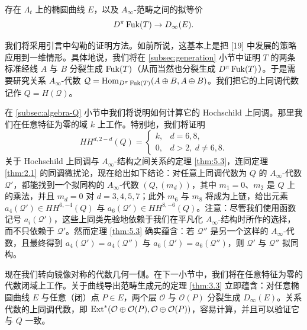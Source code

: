 \begin{theorem}\label{thm:6.1}
存在 $\Lambda_t$ 上的椭圆曲线 $E$，以及 $A_\infty$-范畴之间的拟等价
\[
D^\pi\operatorname{Fuk}(T)\to D_\infty(E).
\]
\end{theorem}


我们将采用引言中勾勒的证明方法。如前所说，这基本上是把 [19] 中发展的策略应用到一维情形。具体地说，我们将在 \ref{subsec:generation} 小节中证明 $T$ 的两条标准经线 $A$ 与 $B$ 分裂生成 $\operatorname{Fuk}(T)$（从而当然也分裂生成 $D^\pi\operatorname{Fuk}(T)$）。于是需要研究关系 $A_\infty$-代数 $\mathcal{Q}=\operatorname{Hom}_{D^\pi\operatorname{Fuk}(T)}(A\oplus B,A\oplus B)$。我们把它的上同调代数记作 $Q=H(\mathcal{Q})$。

在 \ref{subsec:algebra-Q} 小节中我们将说明如何计算它的 Hochschild 上同调。那里我们在任意特征为零的域 $k$ 上工作。特别地，我们将证明
\[
HH^{d,2-d}(Q)=\begin{cases}k, & d=6,8,\\ 0, & d>2,\ d\neq6,8.\end{cases}
\]
关于 Hochschild 上同调与 $A_\infty$-结构之间关系的定理 \ref{thm:5.3}，连同定理 \ref{thm:2.1} 的同调微扰论，现在给出如下结论：对任意上同调代数为 $Q$ 的 $A_\infty$-代数 $\mathcal{Q}'$，都能找到一个拟同构的 $A_\infty$-代数 $(Q,(m_d))$，其中 $m_1=0$、$m_2$ 是 $Q$ 上的乘法，并且 $m_d=0$ 对 $d=3,4,5,7$；此外 $m_6$ 与 $m_8$ 将成为上链，给出元素 $a_4(\mathcal{Q}')\in HH^{6,-4}(Q)$ 与 $a_6(\mathcal{Q}')\in HH^{8,-6}(Q)$。注意：尽管我们使用函数记号 $a_i(\mathcal{Q}')$，这些上同类先验地依赖于我们在平凡化 $A_\infty$-结构时所作的选择，而不只依赖于 $\mathcal{Q}'$。然而定理 \ref{thm:5.3} 确实蕴含：若 $\mathcal{Q}''$ 是另一个这样的 $A_\infty$-代数，且最终得到 $a_4(\mathcal{Q}')=a_4(\mathcal{Q}'')$ 与 $a_6(\mathcal{Q}')=a_6(\mathcal{Q}'')$，则 $\mathcal{Q}'$ 与 $\mathcal{Q}''$ 拟同构。


现在我们转向镜像对称的代数几何一侧。在下一小节中，我们将在任意特征为零的代数闭域上工作。关于曲线导出范畴生成元的定理 \ref{thm:3.3} 立即蕴含：对任意椭圆曲线 $E$ 与任意（闭）点 $P\in E$，两个层 $\mathcal{O}$ 与 $\mathcal{O}(P)$ 分裂生成 $D_\infty(E)$。关系代数的上同调代数，即 $\operatorname{Ext}^{*}(\mathcal{O}\oplus\mathcal{O}(P),\mathcal{O}\oplus\mathcal{O}(P))$，容易计算，并且可以验证它与 $Q$ 一致。

